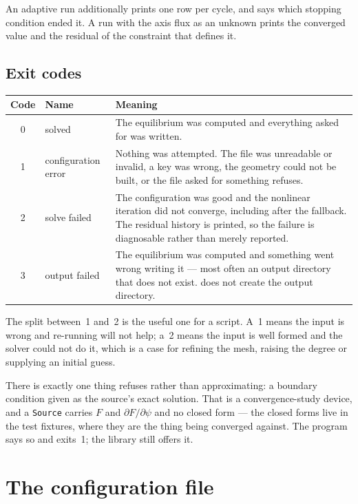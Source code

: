 An adaptive run additionally prints one row per cycle, and says which stopping
condition ended it. A run with the axis flux as an unknown prints the converged
value and the residual of the constraint that defines it.

\subsection{Exit codes}

\begin{center}
\begin{tabular}{c l p{}}
	\hline
	Code & Name & Meaning \\
	\hline
	0 & solved & The equilibrium was computed and everything asked for was
		written. \\
	1 & configuration error & Nothing was attempted. The file was unreadable or
		invalid, a key was wrong, the geometry could not be built, or the file
		asked for something {\meq} refuses. \\
	2 & solve failed & The configuration was good and the nonlinear iteration
		did not converge, including after the fallback. The residual history is
		printed, so the failure is diagnosable rather than merely reported. \\
	3 & output failed & The equilibrium was computed and something went wrong
		writing it --- most often an output directory that does not exist.
		{\meq} does not create the output directory. \\
	\hline
\end{tabular}
\end{center}

The split between~1 and~2 is the useful one for a script. A~1 means the input is
wrong and re-running will not help; a~2 means the input is well formed and the
solver could not do it, which is a case for refining the mesh, raising the
degree or supplying an initial guess.

There is exactly one thing {\meq} refuses rather than approximating: a boundary
condition given as the source's exact solution. That is a convergence-study
device, and a \texttt{Source} carries $F$ and $\partial F/\partial\psi$ and no
closed form --- the closed forms live in the test fixtures, where they are the
thing being converged against. The program says so and exits~1; the library
still offers it.

\section{The configuration file}

